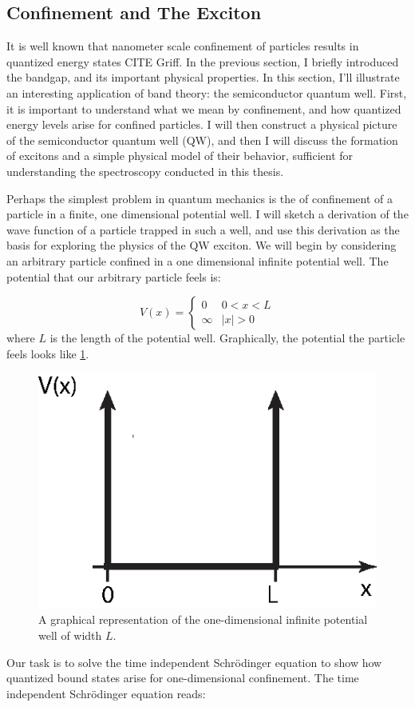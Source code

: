 \subsection{Confinement and The Exciton}
\indent It is well known that nanometer scale confinement of particles results in quantized energy states CITE Griff. In the previous section, I briefly introduced the bandgap, and its important physical properties. In this section, I'll illustrate an interesting application of band theory: the semiconductor quantum well. First, it is important to understand what we mean by confinement, and how quantized energy levels arise for confined particles. I will then construct a physical picture of the semiconductor quantum well (QW), and then I will discuss the formation of excitons and a simple physical model of their behavior, sufficient for understanding the spectroscopy conducted in this thesis.

\indent Perhaps the simplest problem in quantum mechanics is the of confinement of a particle in a finite, one dimensional potential well. I will sketch a derivation of the wave function of a particle trapped in such a well, and use this derivation as the basis for exploring the physics of the QW exciton. We will begin by considering an arbitrary particle confined in a one dimensional infinite potential well. The potential that our arbitrary particle feels is:

\[ V(x) = \begin{cases} 
      0 & 0 < x < L \\
      \infty & |x| > 0 
   \end{cases}
\]
where $L$ is the length of the potential well. Graphically, the potential the particle feels looks like \ref{infp}.

\begin{figure}[h!]
\centering
\includegraphics[width = .6\textwidth]{infpotential.eps}
\caption{A graphical representation of the one-dimensional infinite potential well of width $L$.}
\label{infp}
\end{figure}
Our task is to solve the time independent Schr\"{o}dinger equation to show how quantized bound states arise for one-dimensional confinement. The time independent Schr\"{o}dinger equation reads:

